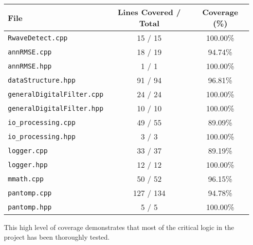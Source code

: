 \documentclass[12pt, titlepage]{article}
\begin{document}
\begin{center}
\begin{tabular}{|l|c|c|}
\hline
\textbf{File} & \textbf{Lines Covered / Total} & \textbf{Coverage (\%)} \\
\hline
\texttt{RwaveDetect.cpp}         & 15 / 15    & 100.00\% \\
\texttt{annRMSE.cpp}             & 18 / 19    & 94.74\%  \\
\texttt{annRMSE.hpp}             & 1 / 1      & 100.00\% \\
\texttt{dataStructure.hpp}       & 91 / 94    & 96.81\%  \\
\texttt{generalDigitalFilter.cpp}& 24 / 24    & 100.00\% \\
\texttt{generalDigitalFilter.hpp}& 10 / 10    & 100.00\% \\
\texttt{io\_processing.cpp}       & 49 / 55    & 89.09\%  \\
\texttt{io\_processing.hpp}       & 3 / 3      & 100.00\% \\
\texttt{logger.cpp}              & 33 / 37    & 89.19\%  \\
\texttt{logger.hpp}              & 12 / 12    & 100.00\% \\
\texttt{mmath.cpp}               & 50 / 52    & 96.15\%  \\
\texttt{pantomp.cpp}             & 127 / 134  & 94.78\%  \\
\texttt{pantomp.hpp}             & 5 / 5      & 100.00\% \\
\hline
\end{tabular}
\end{center}

This high level of coverage demonstrates that most of the critical logic in the
project has been thoroughly tested.






% 
\end{document}
